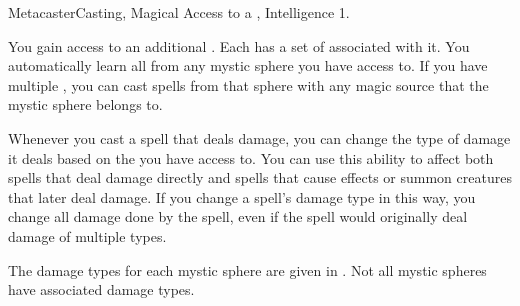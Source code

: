     \begin{feat}{Metacaster}{Casting, Magical}
        \featpre Access to a , Intelligence 1.

         You gain access to an additional .
        Each  has a set of  associated with it.
        You automatically learn all  from any mystic sphere you have access to.
        If you have multiple , you can cast spells from that sphere with any magic source that the mystic sphere belongs to.

         Whenever you cast a spell that deals damage, you can change the type of damage it deals based on the  you have access to.
        You can use this ability to affect both spells that deal damage directly and spells that cause effects or summon creatures that later deal damage.
        If you change a spell's damage type in this way, you change all damage done by the spell, even if the spell would originally deal damage of multiple types.

        The damage types for each mystic sphere are given in .
        Not all mystic spheres have associated damage types.


\end{feat}
